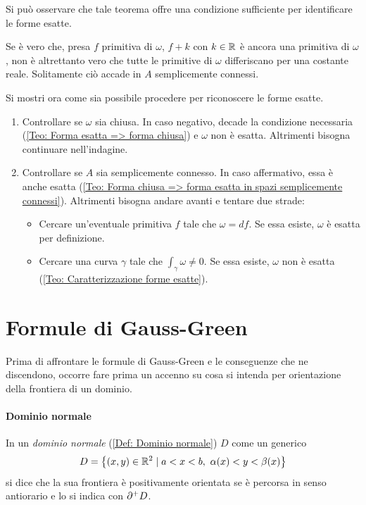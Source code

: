 \begin{oss}
    Si può osservare che tale teorema offre una condizione sufficiente per identificare le forme esatte.
\end{oss}
\begin{oss}
    Se è vero che, presa $f$ primitiva di $\omega$, $f+k$ con $k \in \mathbb{R}$ è ancora una primitiva di $\omega$, non è altrettanto vero che tutte le primitive di $\omega$ differiscano per una costante reale. Solitamente ciò accade in $A$ semplicemente connessi.
\end{oss}
\begin{example}
    Si mostri ora come sia possibile procedere per riconoscere le forme esatte.
\begin{enumerate}
    \item Controllare se $\omega$ sia chiusa. In caso negativo, decade la condizione necessaria (\ref{Teo: Forma esatta => forma chiusa}) e $\omega$ non è esatta. Altrimenti bisogna continuare nell'indagine.
    \item Controllare se $A$ sia semplicemente connesso. In caso affermativo, essa è anche esatta (\ref{Teo: Forma chiusa => forma esatta in spazi semplicemente connessi}). Altrimenti bisogna andare avanti e tentare due strade:
    \begin{itemize}
        \item Cercare un'eventuale primitiva $f$ tale che $\omega= df$. Se essa esiste, $\omega$ è esatta per definizione.
        \item Cercare una curva $\gamma$ tale che $\int_{\gamma}{\omega} \neq 0$. Se essa esiste, $\omega$ non è esatta (\ref{Teo: Caratterizzazione forme esatte}). 
    \end{itemize}
\end{enumerate}
\end{example}
\section{Formule di Gauss-Green}
Prima di affrontare le formule di Gauss-Green e le conseguenze che ne discendono, occorre fare prima un accenno su cosa si intenda per orientazione della frontiera di un dominio.
\paragraph{Dominio normale}
In un \textit{dominio normale} (\ref{Def: Dominio normale}) $D$ come un generico
 \begin{equation}
 D=\left\{ (x,y) \in \mathbb{R}^2 \mid a<x<b,\ \alpha(x)<y<\beta(x)\right\}
 \end{equation}
 si dice che la sua frontiera è positivamente orientata se è percorsa in senso antiorario e lo si indica con $\partial^+ D$.
